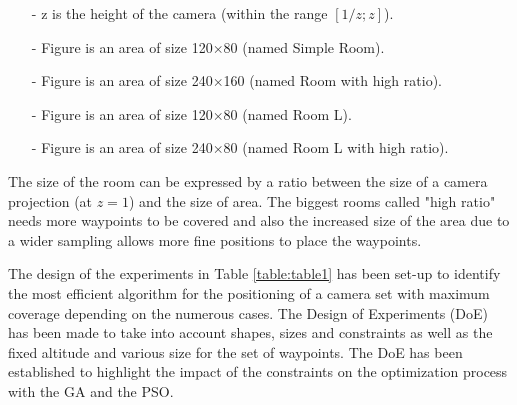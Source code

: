 \begin{itemize}
\item[-]    z is the height of the camera (within the range $[1/z;z]$).
\item[-]	Figure  is an area of size 120$\times$80  (named  Simple Room). 
\item[-]	Figure  is an area of size 240$\times$160 (named Room with high ratio).
\item[-]	Figure  is an area of size 120$\times$80  (named Room L).
\item[-]	Figure  is an area of size 240$\times$80  (named Room L with high ratio).
\end{itemize}

The size of the room can be expressed by a ratio between the size of a camera projection (at $z=1$) and the size of area. The biggest rooms called "high ratio" needs more waypoints to be covered and also the increased size of the area  due to a wider sampling allows more fine positions to place the waypoints.

The design of the experiments in Table \ref{table:table1} has been set-up to identify the most efficient algorithm for the positioning of a camera set with maximum coverage depending on the numerous cases. 
The Design of Experiments (DoE) has been made to take into account shapes, sizes and constraints as well as the fixed altitude and various size for the set of waypoints. The DoE has been established to highlight the impact of the constraints on the optimization process with the GA and the PSO.


